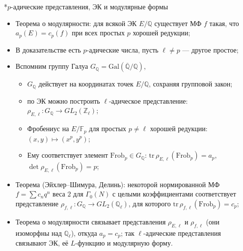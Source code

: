 \documentclass[serif, aspectratio=169]{beamer}
\begin{document}
\begin{frame}{*$p$-адические представления, ЭК и модулярные формы}
    \begin{itemize}
        \item Теорема о модулярности: для всякой ЭК $E/\mathbb{Q}$ существует МФ $f$ такая, что $a_p(E)=c_p(f)$ при всех простых $p$ хорошей редукции;
        \item В доказательстве есть $p$-адические числа, пусть $\ell \neq p$ --- другое простое;
        \item Вспомним группу Галуа $G_{\mathbb{Q}}=\mathrm{Gal}(\overline{\mathbb{Q}}/\mathbb{Q})$,
        \begin{itemize}
            \item $G_{\mathbb{Q}}$ действует на координатах точек $E/\mathbb{Q}$, сохраняя групповой закон;
            \item по ЭК можно построить $\ell$-адическое представление: $\rho_{E,\ell}:G_{\mathbb{Q}}\to GL_2(\mathbb{Z}_\ell)$;
            \item Фробениус на $E/\mathbb{F}_p$ для простых $p\neq \ell$ хорошей редукции: $(x,y)\mapsto(x^p,y^p)$;
            \item Ему соответствует элемент $\mathrm{Frob}_p\in G_{\mathbb{Q}}$: $\mathrm{tr}\,\rho_{E,\ell}(\mathrm{Frob}_p)=a_p$, $\det\rho_{E,\ell}(\mathrm{Frob}_p)=p$;
        \end{itemize}
        \item Теорема (Эйхлер--Шимура, Делинь): некоторой нормированной МФ $f=\sum c_n q^n$ веса $2$ для $\Gamma_0(N)$ с целыми коэффициентами соответствует представление $\rho_{f,\ell}:G_{\mathbb{Q}}\to GL_2(\mathbb{Q}_\ell)$, для которого $\mathrm{tr}\,\rho_{f,\ell}(\mathrm{Frob}_p)=c_p$;
        \item Теорема о модулярности связывает представления $\rho_{E,\ell}$ и $\rho_{f,\ell}$ (они изоморфны над $\mathbb{Q}_\ell$), откуда $a_p=c_p$; так $\ell$-адические представления связывают ЭК, её $L$-функцию и модулярную форму.
    \end{itemize}


\end{frame}
\end{document}
